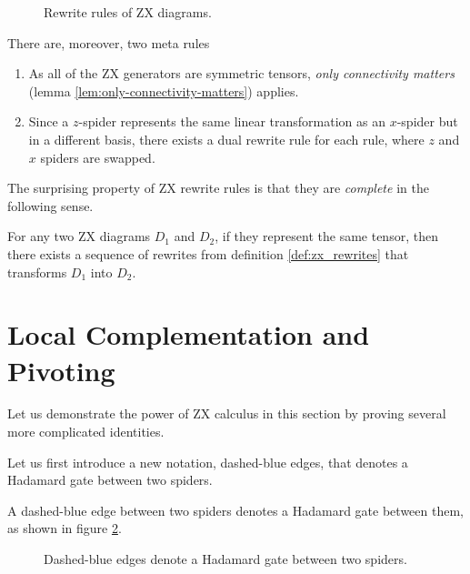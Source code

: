\begin{definition}
\begin{figure}[ht]
	\centering
	\resizebox{\linewidth}{!}{
		
	}
	\caption{Rewrite rules of ZX diagrams. }
	\label{fig:zx_rewrites}
\end{figure}

There are, moreover, two meta rules
\begin{enumerate}
	\item As all of the ZX generators are symmetric tensors, \emph{only connectivity matters} (lemma \ref{lem:only-connectivity-matters}) applies.
	\item Since a $z$-spider represents the same linear transformation as an $x$-spider but in a different basis, there exists a dual rewrite rule for each rule, where $z$ and $x$ spiders are swapped. 
\end{enumerate}
\end{definition}\label{def:zx_rewrites}

The surprising property of ZX rewrite rules is that they are \emph{complete} in the following sense. 

\begin{theorem}
	For any two ZX diagrams $D_1$ and $D_2$, if they represent the same tensor, then there exists a sequence of rewrites from definition \ref{def:zx_rewrites} that transforms $D_1$ into $D_2$.
\end{theorem}

\section{Local Complementation and Pivoting}

Let us demonstrate the power of ZX calculus in this section by proving several more complicated identities.

Let us first introduce a new notation, dashed-blue edges, that denotes a Hadamard gate between two spiders.

\begin{definition}
	A dashed-blue edge between two spiders denotes a Hadamard gate between them, as shown in figure \ref{fig:dashed_blue_edge}.
\end{definition}

\begin{figure}[ht]
	\centering
	
	\caption{Dashed-blue edges denote a Hadamard gate between two spiders.}
	\label{fig:dashed_blue_edge}
\end{figure}


